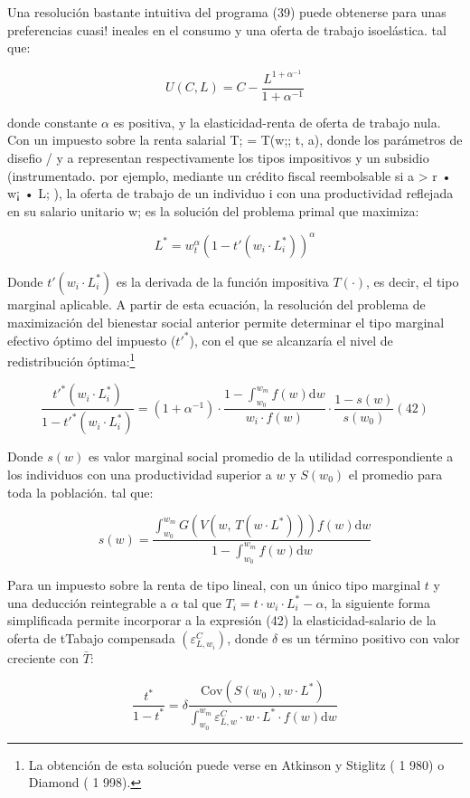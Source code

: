 \documentclass[10pt,a4paper]{article}
\begin{document}
Una resolución bastante intuitiva del programa (39) puede obtenerse para unas preferencias cuasi! ineales en el consumo y una oferta de trabajo isoelástica. tal que:

$$U(C,L)=C-\frac{L^{1+\alpha^{-1}}}{1+\alpha^{-1}}$$

donde constante $\alpha$ es positiva, y la elasticidad-renta de oferta de trabajo nula. Con un impuesto sobre la renta salarial T; = T(w;; t, a), donde los parámetros de disefio / y a representan respectivamente los tipos impositivos y un subsidio (instrumentado. por ejemplo, mediante un crédito fiscal reembolsable si a > r • w¡ • L; ), la oferta de trabajo de un individuo i con una productividad reflejada en su salario unitario w; es la solución del problema primal que maximiza:

$$L^*=w_t^\alpha(1-t'(w_i\cdot L_i^*))^{\alpha}$$

Donde $t'(w_i\cdot L_i^*)$ es la derivada de la función impositiva $T(\cdot)$, es decir, el tipo marginal aplicable. A partir de esta ecuación, la resolución del problema de maximización del bienestar social anterior permite determinar el tipo marginal efectivo óptimo del impuesto ($t'^{*}$), con el que se alcanzaría el nivel de redistribución óptima:\footnote{%
    La obtención de esta solución puede verse en Atkinson y Stiglitz ( 1 980) o Diamond ( 1 998).
}

$$\frac{t'^*(w_i\cdot L_i^*)}{1-t'^*(w_i\cdot L_i^*)}=(1+\alpha^{-1})\cdot \frac{1-\int_{w_0}^{w_m}f(w)\mathrm dw}{w_i\cdot f(w)}\cdot \frac{1-s(w)}{s(w_0)} (42)$$

Donde $s(w)$ es valor marginal social promedio de la utilidad correspondiente a los individuos con una productividad superior a $w$ y $S(w_0)$ el promedio para toda la población. tal que:

$$s(w)=\frac{\int_{w_0}^{w_m}G(V(w,\,T(w\cdot L^*)))f(w)\mathrm dw}{1-\int_{w_0}^{w_m}f(w)\mathrm dw}$$

Para un impuesto sobre la renta de tipo lineal, con un único tipo marginal $t$ y una deducción reintegrable a $\alpha$ tal que $T_i=t\cdot w_i\cdot L_i^*-\alpha$, la siguiente forma simplificada permite incorporar a la expresión (42) la elasticidad-salario de la oferta de tTabajo compensada $(\varepsilon_{L,w_i}^C)$, donde $\delta$ es un término positivo con valor creciente con $\bar T$:

$$\frac{t^*}{1-t^*}=\delta \frac{\text{Cov}(S(w_0),w\cdot L^*)}{\int_{w_0}^{w_m}\varepsilon_{L,w}^{C}\cdot w\cdot L^*\cdot f(w)\mathrm dw}$$
\end{document}

